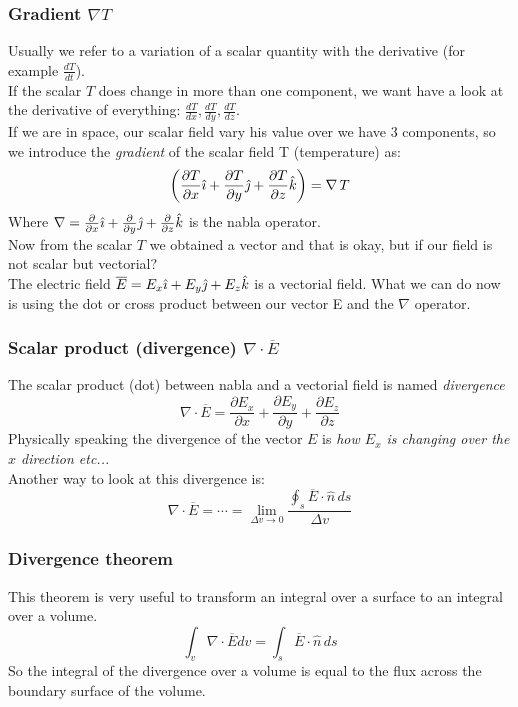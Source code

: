 \subsubsection*{Gradient $\nabla T$}
Usually we refer to a variation of a scalar quantity with the derivative (for example $\frac{dT}{dt}$).\\
If the scalar $T$ does change in more than one component, we want have a look at the derivative of everything: $\frac{dT}{dx},\frac{dT}{dy},\frac{dT}{dz}$.\\
If we are in space, our scalar field vary his value over we have 3 components, so we introduce the \emph{gradient} of the scalar field T (temperature) as:
\begin{equation}
\left(\frac{\partial T}{\partial x}\hat{\imath}+\frac{\partial T}{\partial y}\hat{\jmath}+\frac{\partial T}{\partial z}\hat{\mathnormal{k}}\right)=\nabla\,T
\end{equation}
Where $\nabla=\frac{\partial}{\partial x}\hat{\imath} +\frac{\partial}{\partial y}\hat{\jmath} +\frac{\partial}{\partial z}\hat{\mathnormal{k}}$ is the nabla operator.\\
Now from the scalar $T$ we obtained a vector and that is okay, but if our field is not scalar but vectorial?\\
The electric field $\overline{E}=E_x \hat{\imath} + E_y \hat{\jmath} + E_z \hat{\mathnormal{k}}$ is a vectorial field.
What we can do now is using the dot or cross product between our vector E and the $\nabla$ operator.
\subsubsection*{Scalar product (divergence) $\nabla \cdot \overline{E}$}
The scalar product (dot) between nabla and a vectorial field is named \emph{divergence}
\begin{equation}
\nabla \cdot \overline{E} =\frac{\partial E_x}{\partial x}+\frac{\partial E_y}{\partial y}+\frac{\partial E_z}{\partial z}
\end{equation}
Physically speaking the divergence of the vector $E$ is \textit{how $E_x$ is changing over the $x$ direction etc...}\\
Another way to look at this divergence is:
\begin{equation}
\nabla \cdot \overline{E} = \cdots = \lim_{\Delta v \rightarrow 0}\frac{\oint_s \overline{E}\cdot \hat{n}\, ds}{\Delta v}
\end{equation}
\subsubsection*{Divergence theorem}
This theorem is very useful to transform an integral over a surface to an integral over a volume.
\begin{equation}\label{eq:divergence_theorem}
\int_v \nabla \cdot \overline{E} dv= \int_s \overline{E}\cdot \hat{n}\,ds
\end{equation}
So the integral of the divergence over a volume is equal to the flux across the boundary surface of the volume.
